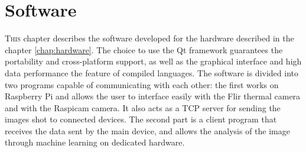 \chapter{Software}
\label{chap:software}
%
\lettrine[lines=3]{T}{his} chapter describes the software developed for the
hardware described in the chapter \ref{chap:hardware}. The choice to use the Qt
framework guarantees the portability and cross-platform support, as well
as the graphical interface and high data performance the feature of compiled
languages.  The software is divided into two programs capable of communicating
with each other: the first works on Raspberry Pi and allows the user to
interface easily with the Flir thermal camera and with the Raspicam camera. It
also acts as a TCP server for sending the images shot to connected devices. The
second part is a client program that receives the data sent by the main device,
and allows the analysis of the image through machine learning on dedicated
hardware.
%


